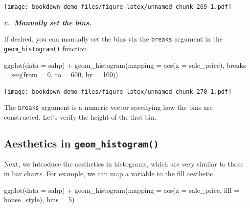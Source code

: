 \documentclass[
]{book}
\newenvironment{Shaded}{\begin{snugshade}}{\end{snugshade}}
\newcommand{\AttributeTok}[1]{\textcolor[rgb]{0.77,0.63,0.00}{#1}}
\newcommand{\CommentTok}[1]{\textcolor[rgb]{0.56,0.35,0.01}{\textit{#1}}}
\newcommand{\DecValTok}[1]{\textcolor[rgb]{0.00,0.00,0.81}{#1}}
\newcommand{\FunctionTok}[1]{\textcolor[rgb]{0.00,0.00,0.00}{#1}}
\newcommand{\NormalTok}[1]{#1}
\newcommand{\SpecialCharTok}[1]{\textcolor[rgb]{0.00,0.00,0.00}{#1}}
\begin{document}
\texttt{[image: bookdown-demo\_files/figure-latex/unnamed-chunk-269-1.pdf]}

\textbf{\emph{c.~Manually set the bins.}}

If desired, you can manually set the bins via the \texttt{breaks} argument in the \texttt{geom\_histogram()} function.

\begin{Shaded}
\begin{Highlighting}[]
\FunctionTok{ggplot}\NormalTok{(}\AttributeTok{data =}\NormalTok{ sahp) }\SpecialCharTok{+} \FunctionTok{geom\_histogram}\NormalTok{(}\AttributeTok{mapping =} \FunctionTok{aes}\NormalTok{(}\AttributeTok{x =}\NormalTok{ sale\_price), }\AttributeTok{breaks =} \FunctionTok{seq}\NormalTok{(}\AttributeTok{from =} \DecValTok{0}\NormalTok{, }\AttributeTok{to =} \DecValTok{600}\NormalTok{, }\AttributeTok{by =} \DecValTok{100}\NormalTok{))  }
\end{Highlighting}
\end{Shaded}

\texttt{[image: bookdown-demo\_files/figure-latex/unnamed-chunk-270-1.pdf]}

The \texttt{breaks} argument is a numeric vector specifying how the bins are constructed. Let's verify the height of the first bin.

\begin{Shaded}
\end{Shaded}

\hypertarget{aesthetics-in-geom_histogram}{%
\subsection{\texorpdfstring{Aesthetics in \texttt{geom\_histogram()}}{Aesthetics in geom\_histogram()}}\label{aesthetics-in-geom_histogram}}

Next, we introduce the aesthetics in histograms, which are very similar to those in bar charts. For example, we can map a variable to the fill aesthetic.

\begin{Shaded}
\begin{Highlighting}[]
\FunctionTok{ggplot}\NormalTok{(}\AttributeTok{data =}\NormalTok{ sahp) }\SpecialCharTok{+} \FunctionTok{geom\_histogram}\NormalTok{(}\AttributeTok{mapping =} \FunctionTok{aes}\NormalTok{(}\AttributeTok{x =}\NormalTok{ sale\_price, }\AttributeTok{fill =}\NormalTok{ house\_style), }\AttributeTok{bins =} \DecValTok{5}\NormalTok{)}
\end{Highlighting}
\end{Shaded}
\end{document}
